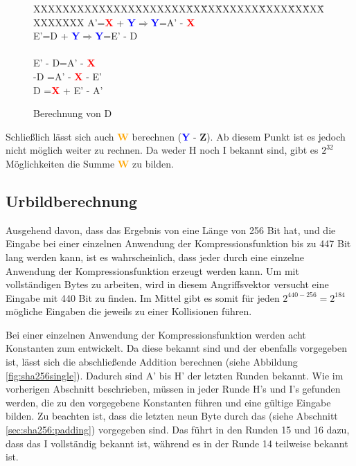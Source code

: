 \begin{figure}[!h]
  \begin{tabbing}
    XXXXXXXXXXXXXXXXXXXXX\=XX\=XX\=XXXXXX\=XXXX\=XX\=XX\=XXXXXXXX \kill
    \>A'\>=\>\textcolor{red}{\textbf{X}} + \textcolor{blue}{\textbf{Y}}\>$\Rightarrow$\>\textcolor{blue}{\textbf{Y}}\>=\>A' - \textcolor{red}{\textbf{X}}\\
    \>E'\>=\>D + \textcolor{blue}{\textbf{Y}}\>$\Rightarrow$\>\textcolor{blue}{\textbf{Y}}\>=\>E' - D\\
    \>~\\
    \>\>\>E' - D\>=\>A' - \textcolor{red}{\textbf{X}}\\
    \>\>\>-D    \>=\>A' - \textcolor{red}{\textbf{X}} - E'\\
    \>\>\>D     \>=\>\textcolor{red}{\textbf{X}} + E' - A'
  \end{tabbing}
  \caption{Berechnung von D}
  \label{eq:calcD}
\end{figure}

Schließlich lässt sich auch \textcolor{orange}{\textbf{W}} berechnen (\textcolor{blue}{\textbf{Y}} - \textcolor{Strong Green}{\textbf{Z}}). Ab diesem Punkt ist
es jedoch nicht möglich weiter zu rechnen. Da weder H noch I bekannt sind, gibt es $2^{32}$ Möglichkeiten die Summe \textcolor{orange}{\textbf{W}} zu bilden.

\subsection{Urbildberechnung}
\label{sec:urbildberechnung}
Ausgehend davon, dass das Ergebnis von  eine Länge von 256 Bit hat, und die Eingabe bei einer einzelnen Anwendung der Kompressionsfunktion bis zu
447 Bit lang werden kann, ist es wahrscheinlich, dass jeder  durch eine einzelne Anwendung der Kompressionsfunktion erzeugt werden kann. Um mit vollständigen
Bytes zu arbeiten, wird in diesem Angriffsvektor versucht eine Eingabe mit 440 Bit zu finden. Im Mittel gibt es somit für jeden  $2^{440-256} = 2^{184}$
mögliche Eingaben die jeweils zu einer Kollisionen führen.

Bei einer einzelnen Anwendung der Kompressionsfunktion werden acht Konstanten zum  entwickelt. Da diese bekannt sind und der  ebenfalls vorgegeben ist,
lässt sich die abschließende Addition berechnen (siehe Abbildung \ref{fig:sha256single}). Dadurch sind A' bis H' der letzten Runden bekannt. Wie im vorherigen
Abschnitt beschrieben, müssen in jeder Runde H's und I's gefunden werden, die zu den vorgegebene Konstanten führen und eine gültige Eingabe bilden. Zu beachten
ist, dass die letzten neun Byte durch das  (siehe Abschnitt \ref{sec:sha256:padding}) vorgegeben sind. Das führt in den Runden 15 und 16 dazu, dass
das I vollständig bekannt ist, während es in der Runde 14 teilweise bekannt ist.

